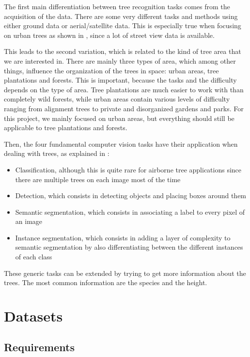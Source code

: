 \documentclass[
]{report}
\providecommand{\tightlist}{%
  \setlength{\itemsep}{0pt}\setlength{\parskip}{0pt}}\usepackage{longtable,booktabs,array}
\begin{document}
The first main differentiation between tree recognition tasks comes from
the acquisition of the data. There are some very different tasks and
methods using either ground data or aerial/satellite data. This is
especially true when focusing on urban trees as shown in
\autocite{urban-trees}, since a lot of street view data is available.

This leads to the second variation, which is related to the kind of tree
area that we are interested in. There are mainly three types of area,
which among other things, influence the organization of the trees in
space: urban areas, tree plantations and forests. This is important,
because the tasks and the difficulty depends on the type of area. Tree
plantations are much easier to work with than completely wild forests,
while urban areas contain various levels of difficulty ranging from
alignment trees to private and disorganized gardens and parks. For this
project, we mainly focused on urban areas, but everything should still
be applicable to tree plantations and forests.

Then, the four fundamental computer vision tasks have their application
when dealing with trees, as explained in \autocite{olive-tree}:

\begin{itemize}
\tightlist
\item
  Classification, although this is quite rare for airborne tree
  applications since there are multiple trees on each image most of the
  time
\item
  Detection, which consists in detecting objects and placing boxes
  around them
\item
  Semantic segmentation, which consists in associating a label to every
  pixel of an image
\item
  Instance segmentation, which consists in adding a layer of complexity
  to semantic segmentation by also differentiating between the different
  instances of each class
\end{itemize}

These generic tasks can be extended by trying to get more information
about the trees. The most common information are the species and the
height.

\section{Datasets}\label{datasets}

\subsection{Requirements}\label{requirements}
\end{document}
